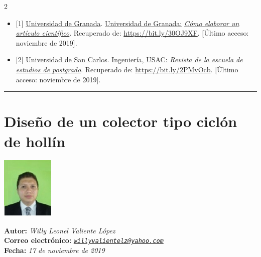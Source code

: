 \documentclass[12pt,spanish,Letterpaper,openany]{book}
\newcommand{\tcolorboxcommand}{\begin{tcolorbox}[sharp corners=uphill, colback=newfondo, colframe=newfondo, arc=6mm, boxrule=0mm, boxsep=0mm]}
\newcommand{\HRule}{\begin{center}\rule{0.5\linewidth}{0.2mm}\end{center}}
\begin{document}
\begin {multicols}{2}
\begin{itemize}
\item
  {[}1{]} \href{https://www.ugr.es/~filosofia/recursos/innovacion/convo-2005/trabajo-escrito/como-elaborar-un-articulo-cientifico.htm}{Universidad de Granada}. \href{https://www.ugr.es}{Universidad de Granada:} \href{https://www.ugr.es/~filosofia/recursos/innovacion/convo-2005/trabajo-escrito/como-elaborar-un-articulo-cientifico.htm}{\emph{Cómo elaborar un artículo científico}}. Recuperado de: \url{https://bit.ly/30OJ9XF}. {[}Último acceso: noviembre de 2019{]}.
\item
  {[}2{]} \href{https://portal.ingenieria.usac.edu.gt/}{Universidad de San Carlos}. \href{http://www.revistasguatemala.usac.edu.gt/}{Ingeniería, USAC:} \href{http://www.revistasguatemala.usac.edu.gt/index.php/reep/issue/view/90/showToc}{\emph{Revista de la escuela de estudios de postgrado}}. Recuperado de: \url{https://bit.ly/2PMvOcb}. {[}Último acceso: noviembre de 2019{]}.
\end{itemize}

\end {multicols}

\medskip

\HRule

\medskip

\hypertarget{wvaliente}{%
\chapter{Diseño de un colector tipo ciclón de hollín}\label{wvaliente}}

\begin {flushleft}

\tcolorboxcommand

\begin{minipage}[c]{3cm}

\includegraphics[width=2.5cm,height=\textheight]{images/image01_wvaliente.jpg}

\end{minipage}\begin{minipage}[c]{12cm}

\textbf{Autor:} \emph{Willy Leonel Valiente López}\\
\textbf{Correo electrónico:} \emph{\href{mailto:willyvalientelz@yahoo.com}{\nolinkurl{willyvalientelz@yahoo.com}}}\\
\textbf{Fecha:} \emph{17 de noviembre de 2019}

\end{minipage}

\end {tcolorbox}

\end {flushleft}
\end{document}

